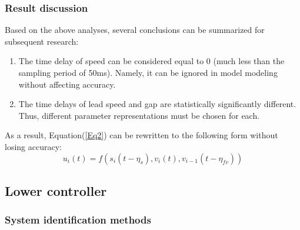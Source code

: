 \documentclass[a4paper]{cas-sc}
\begin{document}
\subsubsection{Result discussion}
\label{Section 3.2.3}

Based on the above analyses, several conclusions can be summarized for subsequent research:
\begin{enumerate}
  \item The time delay of speed can be considered equal to 0 (much less than the sampling period of 50ms). Namely, it can be ignored in model modeling without affecting accuracy.
  \item The time delays of lead speed and gap are statistically significantly different. Thus, different parameter representations must be chosen for each.
\end{enumerate}

As a result, Equation(\ref{Eq2}) can be rewritten to the following form without losing accuracy:
\begin{equation}
  u_i\left(t\right)=f(s_i\left(t-\eta_s\right),v_i\left(t\right),v_{i-1}(t-\eta_{fv}))
  \label{Eq10}
\end{equation}


\subsection{Lower controller}
\label{Section 3.3}

\subsubsection{System identification methods}
\label{Section 3.3.1}
\end{document}
